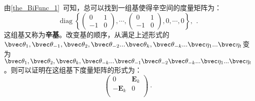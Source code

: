 由\autoref{the_BiFunc_1}~可知，总可以找到一组基使得辛空间的度量矩阵为：
\begin{equation}
\operatorname{diag}\left\{\left(\begin{array}{rr}
0 & 1 \\
-1 & 0
\end{array}\right), \cdots,\left(\begin{array}{rr}
0 & 1 \\
-1 & 0
\end{array}\right), 0, \cdots, 0\right\} \text {, }
~.\end{equation}
这组基又称为\textbf{辛基}。改变基的顺序，从满足上述形式的${\bvec \theta_1,\bvec\theta_{-1},\bvec\theta_2,\bvec\theta_{-2}...\bvec \theta_k,\bvec\theta_{-k}...\bvec\eta_1...\bvec\eta_t}$变为${\bvec \theta_1,\bvec\theta_2,\bvec \theta_k,\bvec\theta_{-k}...\bvec\theta_{-1}\bvec\theta_{-2}\bvec\theta_{-k}...\bvec\eta_1...\bvec\eta_t}$。则可以证明在这组基下度量矩阵的形式为：
\begin{equation}
\begin{pmatrix}
 0 & \boldsymbol E_k \\
  -\boldsymbol E_k&  0\\
\end{pmatrix}~.
\end{equation}